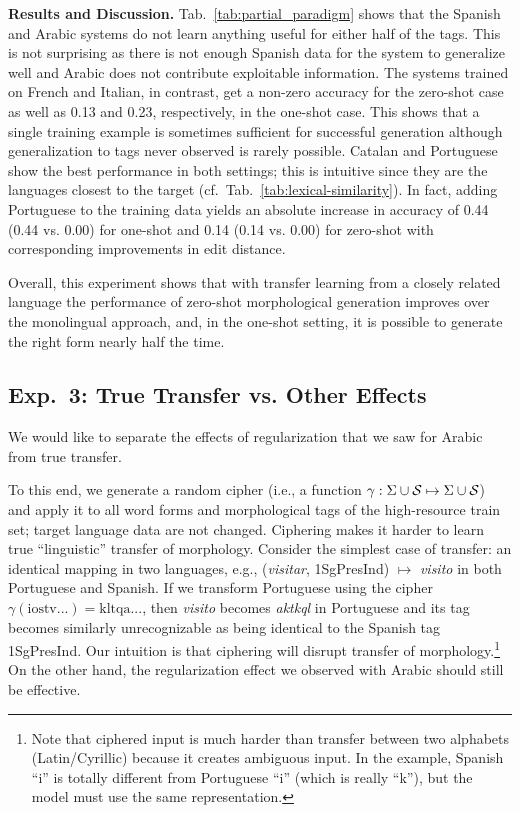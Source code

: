 \documentclass[11pt,letterpaper]{article}
\newcommand{\word}[1]{{\em #1}}
\newcommand{\mtag}[1]{{\small{\textsf{#1}}}}
\def\tabref#1{Tab.~\ref{tab:#1}}
\begin{document}
\textbf{Results and Discussion.}
\tabref{partial_paradigm} shows that the Spanish and Arabic
systems do not learn anything useful for either
half of the tags. This is not surprising as there is not
enough Spanish data for the system to generalize well and
Arabic does not contribute exploitable information.
The systems trained on French and Italian, in contrast,
get a non-zero accuracy for the zero-shot case as well
as 0.13 and 0.23, respectively, in the one-shot
case. This shows that a single training example is
sometimes sufficient for successful generation although
generalization to tags never observed is rarely possible.
Catalan and Portuguese show the best performance in both
settings; this is intuitive since they are  the languages
closest to
the target  (cf.\ \tabref{lexical-similarity}). In
fact, adding Portuguese to the training data yields an
absolute increase in accuracy of 0.44 (0.44 vs. 0.00) for one-shot
 and 0.14 (0.14 vs. 0.00) for zero-shot with corresponding improvements in
 edit distance.

Overall, this experiment shows that with transfer
learning from a closely related language the performance of
zero-shot morphological generation improves over the monolingual approach, 
and, in the one-shot setting, it is possible to generate the right
form nearly half the time.


\subsection{Exp.\ 3: True Transfer vs. Other Effects}
We would like to separate the effects of regularization that
we saw for Arabic from true transfer.

To this end,
we generate a random cipher (i.e., a function $\gamma:
\Sigma \cup {\cal S}
\mapsto \Sigma \cup {\cal S}$) and apply it to all
word forms and morphological tags of the high-resource train
set; target language data are not changed. 
Ciphering makes it harder to learn
true ``linguistic'' transfer of
morphology. Consider the simplest case of transfer: an
identical mapping in two languages, e.g., (\word{visitar},
\mtag{1SgPresInd}) $\mapsto$ \word{visito} in both
Portuguese and Spanish. If we transform Portuguese using the
cipher $\gamma(\mbox{iostv...}) = \mbox{kltqa...}$, then
\word{visito} becomes \word{aktkql} in Portuguese and its
tag becomes similarly unrecognizable as being identical to
the Spanish tag \mtag{1SgPresInd}. Our intuition is that
ciphering will disrupt
transfer of morphology.\footnote{Note that ciphered input is
  much harder than transfer between two alphabets (Latin/Cyrillic)
because it
  creates ambiguous input. In the example, Spanish ``i'' 
 is totally different from Portuguese ``i'' (which is really
 ``k''), but the model must use the same representation.}
On the other hand, the regularization effect we
observed with Arabic should still be effective.
\end{document}
